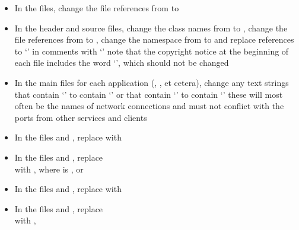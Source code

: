 \begin{itemize}
\item In the  files, change the file references from
 to 
\item\exSp{} In the  header and source files, change the class names from
 to , change the file references from
 to , change the namespace from
 to  and replace references to `' in
comments with `' \longDash{} note that the copyright notice at the beginning
of each file includes the word `', which should not be changed
\item\exSp{} In the main files for each application (,
, et cetera),
change any text strings that contain `' to contain `' or that
contain `' to contain `' \longDash{} these will most often be
the names of \yarp{} network connections and must not conflict with the ports from other
services and clients
\item\exSp{} In the files  and ,
replace
with\\
\item\exSp{} In the files  and
, replace\\
 with
,
where  is ,  or 
\item\exSp{} In the files  and ,
replace
with 
\item\exSp{} In the files  and ,
replace\\
with ,

\end{itemize}
